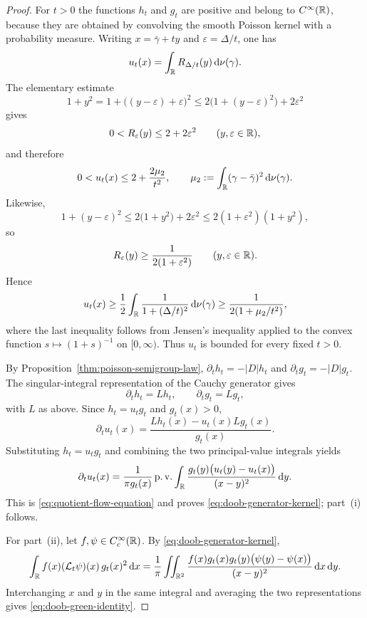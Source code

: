 \begin{proof}
For $t>0$ the functions $h_t$ and $g_t$ are positive and belong to
$C^\infty(\mathbb{R})$, because they are obtained by convolving the smooth
Poisson kernel with a probability measure.  Writing
$x=\bar\gamma+ty$ and $\varepsilon=\Delta/t$, one has
\[
u_t(x)=\int_{\mathbb{R}}R_{\Delta/t}(y)\,\mathrm{d}\nu(\gamma).
\]
The elementary estimate
\[
1+y^2=1+\bigl((y-\varepsilon)+\varepsilon\bigr)^2
\le 2\bigl(1+(y-\varepsilon)^2\bigr)+2\varepsilon^2
\]
gives
\[
0<R_\varepsilon(y)\le 2+2\varepsilon^2
\qquad(y,\varepsilon\in\mathbb{R}),
\]
and therefore
\[
0<u_t(x)\le 2+\frac{2\mu_2}{t^2},
\qquad
\mu_2:=\int_{\mathbb{R}}(\gamma-\bar\gamma)^2\,\mathrm{d}\nu(\gamma).
\]
Likewise,
\[
1+(y-\varepsilon)^2
\le 2\bigl(1+y^2\bigr)+2\varepsilon^2
\le 2(1+\varepsilon^2)(1+y^2),
\]
so
\[
R_\varepsilon(y)\ge \frac{1}{2(1+\varepsilon^2)}
\qquad(y,\varepsilon\in\mathbb{R}).
\]
Hence
\[
u_t(x)\ge \frac12\int_{\mathbb{R}}\frac{1}{1+(\Delta/t)^2}\,\mathrm{d}\nu(\gamma)
\ge \frac{1}{2(1+\mu_2/t^2)},
\]
where the last inequality follows from Jensen's inequality applied to the
convex function $s\mapsto(1+s)^{-1}$ on $[0,\infty)$.
Thus $u_t$ is bounded for every fixed $t>0$.

By Proposition~\ref{thm:poisson-semigroup-law},
$\partial_t h_t=-|D|h_t$ and $\partial_t g_t=-|D|g_t$.
The singular-integral representation of the Cauchy generator
\cite[Definition~2.2 and Proposition~2.4]{Kwasnicki2017} gives
\[
\partial_t h_t=Lh_t,
\qquad
\partial_t g_t=Lg_t,
\]
with $L$ as above.  Since $h_t=u_tg_t$ and $g_t(x)>0$,
\[
\partial_tu_t(x)
=\frac{Lh_t(x)-u_t(x)Lg_t(x)}{g_t(x)}.
\]
Substituting $h_t=u_tg_t$ and combining the two principal-value integrals
yields
\[
\partial_tu_t(x)
=\frac{1}{\pi g_t(x)}\operatorname{p.v.}\int_{\mathbb{R}}
\frac{g_t(y)\bigl(u_t(y)-u_t(x)\bigr)}{(x-y)^2}\,\mathrm{d} y.
\]
This is \eqref{eq:quotient-flow-equation} and proves
\eqref{eq:doob-generator-kernel}; part~(i) follows.

For part~(ii), let $f,\psi\in C_c^\infty(\mathbb{R})$.  By
\eqref{eq:doob-generator-kernel},
\[
\int_{\mathbb{R}}f(x)(\mathcal L_t\psi)(x)\,g_t(x)^2\,\mathrm{d} x
=
\frac{1}{\pi}\iint_{\mathbb{R}^2}
\frac{f(x)g_t(x)g_t(y)\bigl(\psi(y)-\psi(x)\bigr)}
{(x-y)^2}\,\mathrm{d} x\,\mathrm{d} y.
\]
Interchanging $x$ and $y$ in the same integral and averaging the two
representations gives \eqref{eq:doob-green-identity}.


\end{proof}
